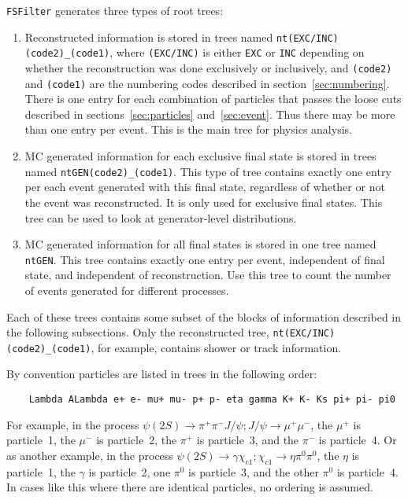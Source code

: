 \documentclass[11pt]{article}
\begin{document}
{\tt FSFilter} generates three types of root trees:
\begin{enumerate}
\item{Reconstructed information is stored in trees named {\tt nt(EXC/INC)(code2)\_(code1)}, where {\tt (EXC/INC)} is either {\tt EXC} or {\tt INC} depending on whether the reconstruction was done exclusively or inclusively, and {\tt (code2)} and {\tt (code1)} are the numbering codes described in section~\ref{sec:numbering}. There is one entry for each combination of particles that passes the loose cuts described in sections~\ref{sec:particles} and~\ref{sec:event}. Thus there may be more than one entry per event.  This is the main tree for physics analysis.}
\item{MC generated information for each exclusive final state is stored in trees named {\tt ntGEN(code2)\_(code1)}.  This type of tree contains exactly one entry per each event generated with this final state, regardless of whether or not the event was reconstructed.  It is only used for exclusive final states.  This tree can be used to look at generator-level distributions.}
\item{MC generated information for all final states is stored in one tree named {\tt ntGEN}.  This tree contains exactly one entry per event, independent of final state, and independent of reconstruction.  Use this tree to count the number of events generated for different processes.}
\end{enumerate}


Each of these trees contains some subset of the blocks of information described in the following subsections.  Only the reconstructed tree, {\tt nt(EXC/INC)(code2)\_(code1)}, for example, contains shower or track information.

By convention particles are listed in trees in the following order:  
\begin{verbatim}
    Lambda ALambda e+ e- mu+ mu- p+ p- eta gamma K+ K- Ks pi+ pi- pi0
\end{verbatim}
For example, in the process $\psi(2S)\to\pi^+\pi^-J/\psi; J/\psi\to\mu^+\mu^-$, the $\mu^+$ is particle~1, the $\mu^-$ is particle~2, the $\pi^+$ is particle~3, and the $\pi^-$ is particle~4. Or as another example, in the process $\psi(2S)\to\gamma\chi_{c1}; \chi_{c1}\to\eta\pi^0\pi^0$, the $\eta$ is particle~1, the $\gamma$ is particle~2, one $\pi^0$ is particle~3, and the other $\pi^0$ is particle~4.  In cases like this where there are identical particles, no ordering is assumed.
\end{document}
